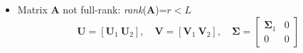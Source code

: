 \begin{itemize}
\[
\mathbf{V} = \left[ \mathbf{V}_1 \;\; \mathbf{V}_2 \right], \quad
\text{where}
\quad
\mathbf{V}_1 = \left[ \mathbf{v}_1 \;\; \mathbf{v}_2 \;\; \cdots \;\; \mathbf{v}_r \right],\;\;
\mathbf{V}_2 = \left[ \mathbf{v}_{r+1} \;\; \cdots \;\; \mathbf{v}_L \right],
\]

\[
\mathbf{\Sigma} = 
\begin{bmatrix}
\mathbf{\Sigma}_1 & 0 \\
0 & 0
\end{bmatrix}, 
\quad \text{where} \quad
\mathbf{\Sigma}_1 = 
\begin{bmatrix}
\sigma_1 & 0 & \cdots & 0 \\
0 & \sigma_2 & \cdots & 0 \\
\vdots & \vdots & \ddots & \vdots \\
0 & 0 & \cdots & \sigma_r
\end{bmatrix}
\]
    \item Matrix \textbf{A} not full-rank: \textit{rank}(\textbf{A})=\(r<L\)
    \[
\mathbf{U} = [\mathbf{U}_1 ~ \mathbf{U}_2], \quad
\mathbf{V} = [\mathbf{V}_1 ~ \mathbf{V}_2], \quad
\mathbf{\Sigma} = 
\begin{bmatrix} 
\mathbf{\Sigma}_1 & 0 \\ 
0 & 0 
\end{bmatrix}
\]


\end{itemize}
